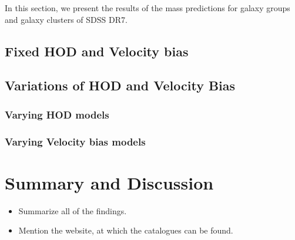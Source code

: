 \documentclass[useAMS,usenatbib, usedcolumn]{mnras}
\begin{document}
In this section, we present the results of the mass predictions for
galaxy groups and galaxy clusters of SDSS DR7.


\subsection{Fixed HOD and Velocity bias}
\label{subsec:fixed_hod_dv}


\subsection{Variations of HOD and Velocity Bias}
\label{subsec:hod_dv_variations}


\subsubsection{Varying HOD models}
\label{subsubsec:fixed_dv_only}



\subsubsection{Varying Velocity bias models}
\label{subsubsec:fixed_HOD_only}








\section{Summary and Discussion}\label{sec:summary_discussion}

\begin{itemize}[leftmargin=0.5\parindent, labelsep=0.5\parindent]
    \item
    Summarize all of the findings.

    \item
    Mention the website, at which the catalogues can be found.
    
\end{itemize}
\end{document}
